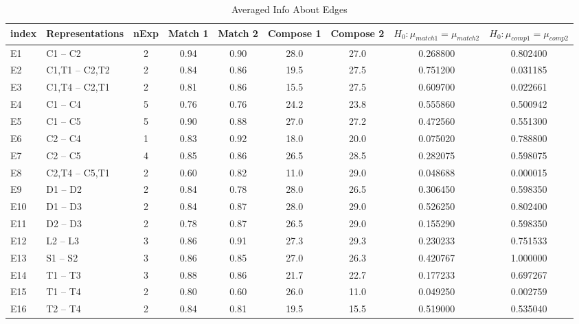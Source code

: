 \begin{table*}\begin{small}\begin{center}\caption{Averaged Info About Edges}\label{table:testedEdgesTable}\begin{tabular}
{llccccccc}
index & Representations & nExp & Match 1 & Match 2 & Compose 1 & Compose 2 & $H_0: \mu_{match1} = \mu_{match2}$ & $H_0: \mu_{comp1} = \mu_{comp2}$ \\
\toprule[0.16em]
E1 & C1 -- C2 & 2 & 0.94 & 0.90 & 28.0 & 27.0 & 0.268800 & 0.802400\\
E2 & C1,T1 -- C2,T2 & 2 & 0.84 & 0.86 & 19.5 & 27.5 & 0.751200 & 0.031185\\
E3 & C1,T4 -- C2,T1 & 2 & 0.81 & 0.86 & 15.5 & 27.5 & 0.609700 & 0.022661\\
E4 & C1 -- C4 & 5 & 0.76 & 0.76 & 24.2 & 23.8 & 0.555860 & 0.500942\\
E5 & C1 -- C5 & 5 & 0.90 & 0.88 & 27.0 & 27.2 & 0.472560 & 0.551300\\
E6 & C2 -- C4 & 1 & 0.83 & 0.92 & 18.0 & 20.0 & 0.075020 & 0.788800\\
E7 & C2 -- C5 & 4 & 0.85 & 0.86 & 26.5 & 28.5 & 0.282075 & 0.598075\\
E8 & C2,T4 -- C5,T1 & 2 & 0.60 & 0.82 & 11.0 & 29.0 & 0.048688 & 0.000015\\
E9 & D1 -- D2 & 2 & 0.84 & 0.78 & 28.0 & 26.5 & 0.306450 & 0.598350\\
E10 & D1 -- D3 & 2 & 0.84 & 0.87 & 28.0 & 29.0 & 0.526250 & 0.802400\\
E11 & D2 -- D3 & 2 & 0.78 & 0.87 & 26.5 & 29.0 & 0.155290 & 0.598350\\
E12 & L2 -- L3 & 3 & 0.86 & 0.91 & 27.3 & 29.3 & 0.230233 & 0.751533\\
E13 & S1 -- S2 & 3 & 0.86 & 0.85 & 27.0 & 26.3 & 0.420767 & 1.000000\\
E14 & T1 -- T3 & 3 & 0.88 & 0.86 & 21.7 & 22.7 & 0.177233 & 0.697267\\
E15 & T1 -- T4 & 2 & 0.80 & 0.60 & 26.0 & 11.0 & 0.049250 & 0.002759\\
E16 & T2 -- T4 & 2 & 0.84 & 0.81 & 19.5 & 15.5 & 0.519000 & 0.535040\\
\bottomrule[0.13em]\end{tabular}\end{center}\end{small}\end{table*}
